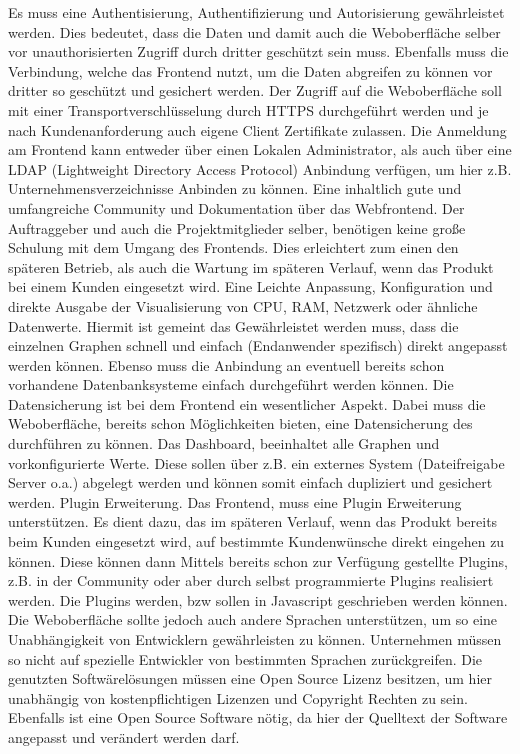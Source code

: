 \begin{outline}
  \1 Es muss eine Authentisierung, Authentifizierung und Autorisierung
  gewährleistet werden. Dies bedeutet, dass die Daten und damit auch die
  Weboberfläche selber vor unauthorisierten Zugriff durch dritter geschützt
  sein muss. Ebenfalls muss die Verbindung, welche das Frontend nutzt, um die
  Daten abgreifen zu können vor dritter so geschützt und gesichert werden. Der
  Zugriff auf die Weboberfläche soll mit einer Transportverschlüsselung durch
  \gls{HTTPS} durchgeführt werden und je nach Kundenanforderung auch eigene
  Client Zertifikate zulassen. Die Anmeldung am Frontend kann entweder über
  einen Lokalen Administrator, als auch über eine LDAP (Lightweight Directory
  Access Protocol) Anbindung verfügen, um hier z.B. Unternehmensverzeichnisse
  Anbinden zu können.
  \1 Eine inhaltlich gute und umfangreiche Community und Dokumentation über das
  Webfrontend. Der Auftraggeber und auch die Projektmitglieder selber,
  benötigen keine große Schulung mit dem Umgang des Frontends. Dies erleichtert
  zum einen den späteren Betrieb, als auch die Wartung im späteren Verlauf,
  wenn das Produkt bei einem Kunden eingesetzt wird.
  \1 Eine Leichte Anpassung, Konfiguration und direkte Ausgabe der
  Visualisierung von CPU, RAM, Netzwerk oder ähnliche Datenwerte. Hiermit ist
  gemeint das Gewährleistet werden muss, dass  die einzelnen Graphen schnell
  und einfach (Endanwender spezifisch) direkt angepasst werden können.  Ebenso
  muss die Anbindung an eventuell bereits schon vorhandene Datenbanksysteme
  einfach durchgeführt werden können.
  \1 Die Datensicherung ist bei dem Frontend ein wesentlicher Aspekt.  Dabei
  muss die Weboberfläche, bereits schon Möglichkeiten bieten, eine
  Datensicherung des  durchführen zu können.
  Das Dashboard, beeinhaltet alle Graphen und vorkonfigurierte Werte. Diese
  sollen über z.B. ein externes System (Dateifreigabe Server o.a.) abgelegt
  werden und können somit einfach dupliziert und gesichert werden.
  \1 Plugin Erweiterung. Das Frontend, muss eine Plugin Erweiterung
  unterstützen. Es dient dazu, das im späteren Verlauf, wenn das Produkt
  bereits beim Kunden eingesetzt wird, auf bestimmte Kundenwünsche direkt
  eingehen zu können. Diese können dann Mittels bereits schon zur Verfügung
  gestellte Plugins, z.B. in der Community oder aber durch selbst programmierte
  Plugins realisiert werden. Die Plugins werden, bzw sollen in Javascript
  geschrieben werden können. Die Weboberfläche sollte jedoch auch andere
  Sprachen unterstützen, um so eine Unabhängigkeit von Entwicklern
  gewährleisten zu können. Unternehmen müssen so nicht auf spezielle
  Entwickler von bestimmten Sprachen zurückgreifen.
  \1 Die genutzten Softwärelösungen müssen eine Open Source Lizenz besitzen, um
  hier unabhängig von kostenpflichtigen Lizenzen und Copyright Rechten zu sein.
  Ebenfalls ist eine Open Source Software nötig, da hier der Quelltext der
  Software angepasst und verändert werden darf.
\end{outline}
\mr%


